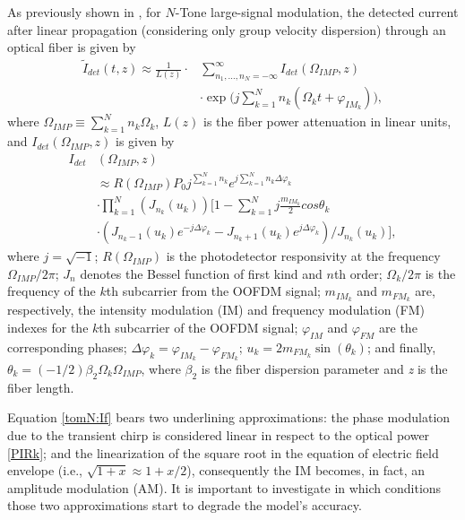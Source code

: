 \documentclass[journal]{IEEEtran}
\begin{document}
As previously shown in \cite{eva}, for $N$-Tone large-signal modulation, the detected current after linear propagation (considering only group velocity dispersion) through an optical fiber is given by
\begin{align} \label{tomN:If} \nonumber
\tilde{I}_{det}(t,z) \approx \frac{1}{L(z)}\cdot&\sum_{n_1, \ldots, n_N = -\infty}^{\infty}I_{det}(\Omega_{IMP},z) \\
& \cdot\exp\Bigg(j\sum_{k = 1}^N n_k(\Omega_kt + \varphi_{IM_k})\Bigg), 
\end{align}
where $\Omega_{IMP} \equiv \sum_{k = 1}^N n_k\Omega_k$, $L(z)$ is the fiber power attenuation in linear units, and $I_{det}(\Omega_{IMP},z)$ is given by
\begin{align} \nonumber \label{tomN:Idetf}
I_{det}&(\Omega_{IMP}, z) \\ \nonumber
& \approx R(\Omega_{IMP})P_0j^{\sum_{k = 1}^Nn_k}e^{j\sum_{k = 1}^N n_k\Delta\varphi_k}\\ \nonumber
& \cdot\prod_{k = 1}^N(J_{n_k}(u_k))\Bigg[1 - \sum_{k = 1}^N j \frac{m_{IM_k}}{2}cos\theta_k \\
& \cdot(J_{n_k-1}(u_k)e^{-j\Delta\varphi_k} - J_{n_k+1}(u_k)e^{j\Delta\varphi_k})/J_{n_k}(u_k)\Bigg],
\end{align}
where $j=\sqrt{-1}$; $R(\Omega_{IMP})$ is the photodetector responsivity at the frequency $\Omega_{IMP}/2\pi$; $J_n$ denotes the Bessel function of first kind and $n$th order; $\Omega_k/2\pi$ is the frequency of the $k$th subcarrier from the OOFDM signal; $m_{IM_k}$ and $m_{FM_k}$ are, respectively, the intensity modulation (IM) and frequency modulation (FM) indexes for the $k$th subcarrier of the OOFDM signal; $\varphi_{IM}$ and $\varphi_{FM}$ are the corresponding phases; $\Delta\varphi_k = \varphi_{IM_k} - \varphi_{FM_k}$; $u_k = 2m_{FM_k}\sin(\theta_k)$; and finally, $\theta_k = (-1/2)\beta_2\Omega_k\Omega_{IMP}$, where $\beta_2$ is the fiber dispersion parameter and \emph{z} is the fiber length. 

Equation \eqref{tomN:If} bears two underlining approximations: the phase modulation due to the transient chirp is considered linear in respect to the optical power \eqref{PIRk}; and the linearization of the square root in the equation of electric field envelope (i.e., $\sqrt{1 + x} \approx 1 + x/2$), consequently the IM becomes, in fact, an amplitude modulation (AM). It is important to investigate in which conditions those two approximations start to degrade the model's accuracy. 
\end{document}
